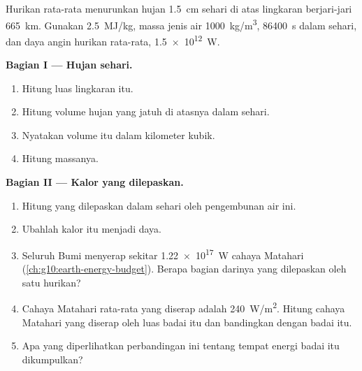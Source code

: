 \begin{problem}
\label{pb:g10:storms-and-cyclones:1}
Hurikan rata-rata menurunkan hujan \qty{1.5}{cm} sehari di atas lingkaran
berjari-jari \qty{665}{km}. Gunakan  \qty{2.5}{MJ/kg}, massa jenis
air \qty{1000}{kg/m^3}, \qty{86400}{s} dalam sehari, dan daya angin hurikan
rata-rata, \qty{1.5e12}{W}.

\medskip
\noindent\textbf{Bagian I --- Hujan sehari.}
\begin{enumerate}
  \item Hitung luas lingkaran itu.
  \item Hitung volume hujan yang jatuh di atasnya dalam sehari.
  \item Nyatakan volume itu dalam kilometer kubik.
  \item Hitung massanya.
\end{enumerate}

\medskip
\noindent\textbf{Bagian II --- Kalor yang dilepaskan.}
\begin{enumerate}[resume]
  \item Hitung  yang dilepaskan dalam sehari oleh pengembunan
        air ini.
  \item Ubahlah kalor itu menjadi daya.
  \item Seluruh Bumi menyerap sekitar \qty{1.22e17}{W} cahaya Matahari
        (\cref{ch:g10:earth-energy-budget}). Berapa bagian darinya yang
        dilepaskan oleh satu hurikan?
  \item Cahaya Matahari rata-rata yang diserap adalah \qty{240}{W/m^2}.
        Hitung cahaya Matahari yang diserap oleh luas badai itu dan
        bandingkan dengan  badai itu.
  \item Apa yang diperlihatkan perbandingan ini tentang tempat energi badai
        itu dikumpulkan?
\end{enumerate}


\end{problem}
